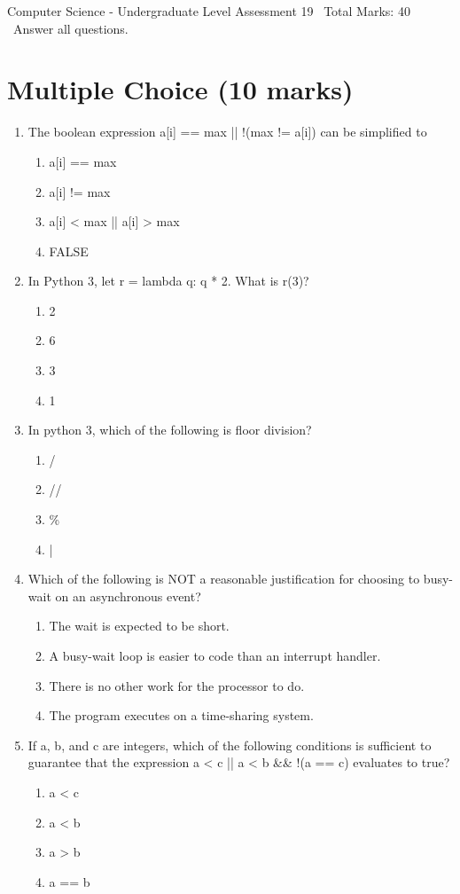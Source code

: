 \documentclass[12pt]{article}
\begin{document}
\begin{center}
Computer Science - Undergraduate Level Assessment 19 \
Total Marks: 40 \
Answer all questions.
\end{center}

\section*{Multiple Choice (10 marks)}
\begin{enumerate}[label=\arabic*.]
\item The boolean expression a[i] == max || !(max != a[i]) can be simplified to
\begin{enumerate}[label=(\alph*)]
    \item a[i] == max
    \item a[i] != max
    \item a[i] \textless{} max || a[i] \textgreater{} max
    \item FALSE
\end{enumerate}
\item In Python 3, let r = lambda q: q * 2. What is r(3)?
\begin{enumerate}[label=(\alph*)]
    \item 2
    \item 6
    \item 3
    \item 1
\end{enumerate}
\item In python 3, which of the following is floor division?
\begin{enumerate}[label=(\alph*)]
    \item /
    \item //
    \item \%
    \item |
\end{enumerate}
\item Which of the following is NOT a reasonable justification for choosing to busy-wait on an asynchronous event?
\begin{enumerate}[label=(\alph*)]
    \item The wait is expected to be short.
    \item A busy-wait loop is easier to code than an interrupt handler.
    \item There is no other work for the processor to do.
    \item The program executes on a time-sharing system.
\end{enumerate}
\item If a, b, and c are integers, which of the following conditions is sufficient to guarantee that the expression a \textless{} c || a \textless{} b \&\& !(a == c) evaluates to true?
\begin{enumerate}[label=(\alph*)]
    \item a \textless{} c
    \item a \textless{} b
    \item a \textgreater{} b
    \item a == b
\end{enumerate}
\end{enumerate}
\end{document}
